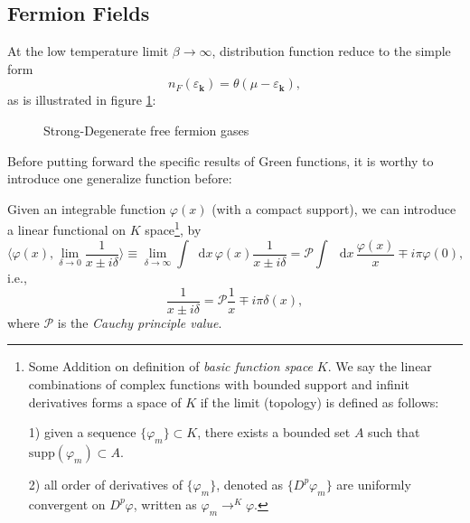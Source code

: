 \documentclass[b5paper,10pt,UTF8]{book}
\newcommand*\dd{\mathop{}\!\mathrm{d}}
\numberwithin{equation}{section}
\begin{document}
		\subsection{Fermion Fields}
			At the low temperature limit $\beta\rightarrow\infty$, distribution function reduce to the simple form
			\begin{equation}\label{2.3.2}
				n_F(\varepsilon_{\bm k})=\theta(\mu-\varepsilon_{\bm k}),
			\end{equation}
			as is illustrated in figure \ref{fig:1}:\par
			\begin{figure}[!htp]
				\centering
				\caption{Strong-Degenerate free fermion gases}
				\label{fig:1}
			\end{figure}
			Before putting forward the specific results of Green functions, it is worthy to introduce one generalize function before:
			\begin{Lemma}
				Given an integrable function $\varphi(x)$ (with a compact support), we can introduce a linear functional on $K$ space\footnote{Some Addition on definition of \emph{basic function space} $K$. We say the linear combinations of complex functions with bounded support and infinit derivatives forms a space of $K$ if the limit (topology) is defined as follows:\par
				1) given a sequence $\{\varphi_m\}\subset K$, there exists a bounded set $A$ such that $\mathrm{supp}(\varphi_m)\subset A$.\par
				2) all order of derivatives of $\{\varphi_m\}$, denoted as $\{D^p \varphi_m\}$ are uniformly convergent on $D^p \varphi$, written as $\displaystyle\varphi_m\mathop{\rightarrow}^{K}\varphi$.}, by
				\begin{equation}\label{2.3.3}
					\bigg\langle\varphi(x),\lim_{\delta\rightarrow0}\dfrac{1}{x\pm i\delta}\bigg\rangle\equiv\lim_{\delta\rightarrow\infty}\int\dd x\,\varphi(x)\dfrac{1}{x\pm i\delta}=\mathcal{P}\int\,\dd x\,\dfrac{\varphi(x)}{x}\mp i\pi \varphi(0),
				\end{equation}
				i.e.,
				$$\dfrac{1}{x\pm i\delta}=\mathcal{P}\dfrac{1}{x}\mp i\pi\delta(x),$$
				where $\mathcal{P}$ is the \emph{Cauchy principle value}.
			\end{Lemma}
\end{document}
